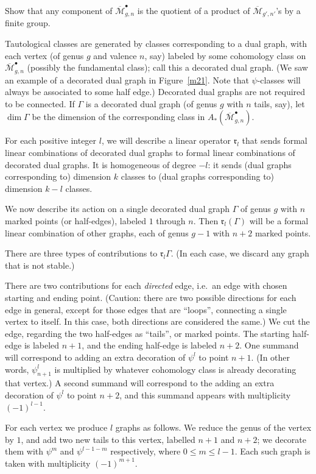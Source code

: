 \documentclass[12pt,letterpaper]{amsart}
\newcommand{\cm}{{\mathcal{M}}}
\newcommand{\cmbar}{\overline{\cm}}
\newcommand{\fr}{\mathfrak{r}}
\newcommand{\Ga}{\Gamma}
\newcommand{\dis}{\bullet}
\begin{document}
{ Show that any component of $\cmbar_{g,n}^{\dis}$
is the quotient of a product of $\cmbar_{g',n'}$'s by a finite group.

Tautological classes are generated by classes corresponding to a dual
graph, with each vertex (of genus $g$ and valence $n$, say) labeled by
some cohomology class on $\cmbar^{\dis}_{g,n}$ (possibly the
fundamental class); call this a decorated dual graph.  (We saw an
example of a decorated dual graph in Figure~\ref{m21}.  Note that
$\psi$-classes will always be associated to some half edge.)  Decorated dual
graphs are not required to be connected.  If $\Ga$ is a decorated dual
graph (of genus $g$ with $n$ tails, say), let $\dim \Ga$ be the
dimension of the corresponding class in $A_*(\cmbar_{g,n}^{\dis})$.

For each positive integer $l$, we will describe a linear operator $\fr_l$
that sends formal linear combinations of decorated dual graphs to
formal linear combinations of decorated dual graphs. 
It is homogeneous of degree $-l$: it sends (dual graphs corresponding
to) dimension $k$ classes to (dual graphs corresponding to) dimension
$k-l$ classes.  

We now describe its action on a single decorated dual graph $\Ga$ of
genus $g$ with $n$ marked points (or half-edges), labeled $1$ through
$n$.  Then $\fr_l (\Ga)$ will be a formal linear combination of other graphs,
each of genus $g-1$ with $n+2$ marked points.

There are three types of contributions to $\fr_l \Ga$.
(In each case, we discard any graph that is not stable.)

There are two contributions for each {\em directed} edge, i.e.\
an edge with chosen starting and ending point.
(Caution:  there are two possible directions for each edge in general,
except for those edges that are ``loops'', connecting a
single vertex to itself.  In this case, both directions are considered
the same.)
We cut the edge, regarding the two half-edges as ``tails'', or
marked points.  The starting half-edge
is labeled $n+1$, and the ending half-edge is labeled $n+2$.
One summand will correspond to adding an extra
decoration of $\psi^l$ to point $n+1$. 
(In other words, $\psi_{n+1}^l$ is multiplied by whatever
cohomology class is already decorating that vertex.)
A second summand will correspond to the adding an extra
decoration of $\psi^l$ to point $n+2$, and this summand
appears with multiplicity $(-1)^{l-1}$.

  For each vertex we produce $l$ graphs as follows.  We reduce the
  genus of the vertex by $1$, and add two new tails to this vertex, 
  labelled $n+1$ and $n+2$; we decorate them with 
  $\psi^m$ and $\psi^{l-1-m}$ respectively, where $0 \leq m \leq
  l-1$. Each such graph is taken with 
  multiplicity $(-1)^{m+1}$.

}
\end{document}
